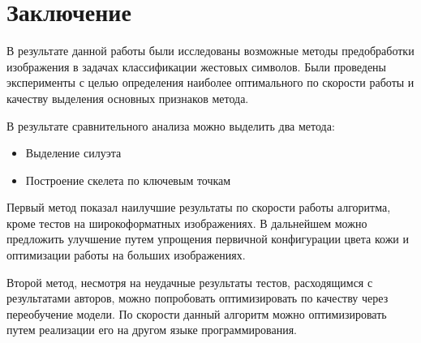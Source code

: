 \section{Заключение}
\label{sec:Conclusion}

В результате данной работы были исследованы возможные методы предобработки изображения в задачах классификации жестовых символов. Были проведены эксперименты с целью определения наиболее оптимального по скорости работы и качеству выделения основных признаков метода. 

В результате сравнительного анализа можно выделить два метода:

\begin{itemize}
	\item Выделение силуэта
	\item Построение скелета по ключевым точкам
\end{itemize}

Первый метод показал наилучшие результаты по скорости работы алгоритма, кроме тестов на широкоформатных изображениях. В дальнейшем можно предложить улучшение путем упрощения первичной конфигурации цвета кожи и оптимизации работы на больших изображениях.

Второй метод, несмотря на неудачные результаты тестов, расходящимся с результатами авторов\cite{DNN}, можно попробовать оптимизировать по качеству через переобучение модели. По скорости данный алгоритм можно оптимизировать путем реализации его на другом языке программирования.